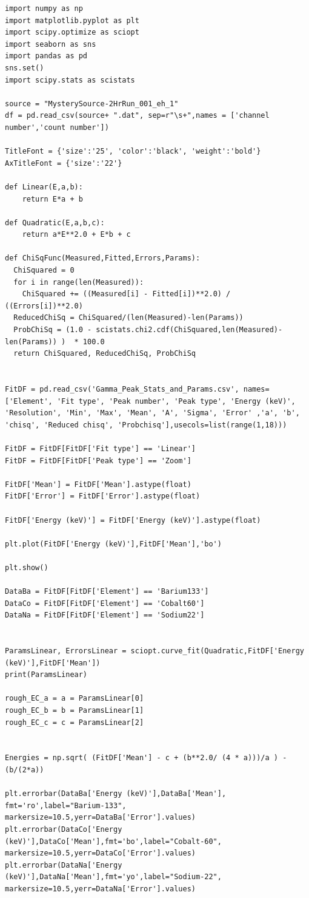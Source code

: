 \documentclass[11pt,a4paper]{article}
\begin{document}
\begin{verbatim}
import numpy as np
import matplotlib.pyplot as plt
import scipy.optimize as sciopt
import seaborn as sns
import pandas as pd
sns.set()
import scipy.stats as scistats

source = "MysterySource-2HrRun_001_eh_1"
df = pd.read_csv(source+ ".dat", sep=r"\s+",names = ['channel number','count number'])

TitleFont = {'size':'25', 'color':'black', 'weight':'bold'} 
AxTitleFont = {'size':'22'}

def Linear(E,a,b):
    return E*a + b

def Quadratic(E,a,b,c):
    return a*E**2.0 + E*b + c

def ChiSqFunc(Measured,Fitted,Errors,Params):
  ChiSquared = 0
  for i in range(len(Measured)):
    ChiSquared += ((Measured[i] - Fitted[i])**2.0) / ((Errors[i])**2.0)
  ReducedChiSq = ChiSquared/(len(Measured)-len(Params))
  ProbChiSq = (1.0 - scistats.chi2.cdf(ChiSquared,len(Measured)-len(Params)) )  * 100.0
  return ChiSquared, ReducedChiSq, ProbChiSq


FitDF = pd.read_csv('Gamma_Peak_Stats_and_Params.csv', names=['Element', 'Fit type', 'Peak number',	'Peak type', 'Energy (keV)', 'Resolution', 'Min', 'Max', 'Mean', 'A', 'Sigma', 'Error' ,'a', 'b', 'chisq', 'Reduced chisq', 'Probchisq'],usecols=list(range(1,18)))

FitDF = FitDF[FitDF['Fit type'] == 'Linear']
FitDF = FitDF[FitDF['Peak type'] == 'Zoom']

FitDF['Mean'] = FitDF['Mean'].astype(float)
FitDF['Error'] = FitDF['Error'].astype(float)

FitDF['Energy (keV)'] = FitDF['Energy (keV)'].astype(float)

plt.plot(FitDF['Energy (keV)'],FitDF['Mean'],'bo')

plt.show()

DataBa = FitDF[FitDF['Element'] == 'Barium133']
DataCo = FitDF[FitDF['Element'] == 'Cobalt60']
DataNa = FitDF[FitDF['Element'] == 'Sodium22']


ParamsLinear, ErrorsLinear = sciopt.curve_fit(Quadratic,FitDF['Energy (keV)'],FitDF['Mean'])
print(ParamsLinear)

rough_EC_a = a = ParamsLinear[0]
rough_EC_b = b = ParamsLinear[1]
rough_EC_c = c = ParamsLinear[2]


Energies = np.sqrt( (FitDF['Mean'] - c + (b**2.0/ (4 * a)))/a ) - (b/(2*a))

plt.errorbar(DataBa['Energy (keV)'],DataBa['Mean'], fmt='ro',label="Barium-133", markersize=10.5,yerr=DataBa['Error'].values)
plt.errorbar(DataCo['Energy (keV)'],DataCo['Mean'],fmt='bo',label="Cobalt-60", markersize=10.5,yerr=DataCo['Error'].values)
plt.errorbar(DataNa['Energy (keV)'],DataNa['Mean'],fmt='yo',label="Sodium-22", markersize=10.5,yerr=DataNa['Error'].values)


\end{verbatim}
\end{document}
